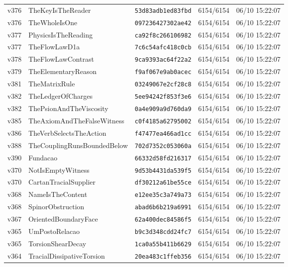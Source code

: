 \documentclass[11pt]{article}
\theoremstyle{definition}\newtheorem{deriv}{Derivação}
\begin{document}
{\begin{longtable}{@{}lllll@{}}
v376 & TheKeyIsTheReader & \texttt{53d83adb1ed83fbd} & 6154/6154 & 06/10 15:22:07 \\
v376 & TheWholeIsOne & \texttt{097236427302ae42} & 6154/6154 & 06/10 15:22:07 \\
v377 & PhysicsIsTheReading & \texttt{ca92f8c266106982} & 6154/6154 & 06/10 15:22:07 \\
v377 & TheFlowLawD1a & \texttt{7c6c54afc418c0cb} & 6154/6154 & 06/10 15:22:07 \\
v378 & TheFlowLawContrast & \texttt{9ca9393ac64f22a2} & 6154/6154 & 06/10 15:22:07 \\
v379 & TheElementaryReason & \texttt{f9af067e9ab0acec} & 6154/6154 & 06/10 15:22:07 \\
v381 & TheMatrixRule & \texttt{03249067e2cf28c8} & 6154/6154 & 06/10 15:22:07 \\
v382 & TheLedgerOfCharges & \texttt{5ee94242f853f3e6} & 6154/6154 & 06/10 15:22:07 \\
v382 & ThePsionAndTheViscosity & \texttt{0a4e909a9d760da9} & 6154/6154 & 06/10 15:22:07 \\
v385 & TheAxiomAndTheFalseWitness & \texttt{c0f4185a62795002} & 6154/6154 & 06/10 15:22:07 \\
v386 & TheVerbSelectsTheAction & \texttt{f47477ea466ad1cc} & 6154/6154 & 06/10 15:22:07 \\
v388 & TheCouplingRunsBoundedBelow & \texttt{702d7352c053060a} & 6154/6154 & 06/10 15:22:07 \\
v390 & Fundacao & \texttt{66332d58fd216317} & 6154/6154 & 06/10 15:22:07 \\
v370 & NotIsEmptyWitness & \texttt{9d53b4431da539f5} & 6154/6154 & 06/10 15:22:07 \\
v370 & CartanTracialSupplier & \texttt{df30212a61be55ce} & 6154/6154 & 06/10 15:22:07 \\
v368 & NameIsTheContent & \texttt{e12ee35c3a749a73} & 6154/6154 & 06/10 15:22:07 \\
v368 & SpinorObstruction & \texttt{abad6b6b219a6991} & 6154/6154 & 06/10 15:22:07 \\
v367 & OrientedBoundaryFace & \texttt{62a400dec84586f5} & 6154/6154 & 06/10 15:22:07 \\
v365 & UmPostoRelacao & \texttt{b9c3d348cdd24fc7} & 6154/6154 & 06/10 15:22:07 \\
v365 & TorsionShearDecay & \texttt{1ca0a55b411b6629} & 6154/6154 & 06/10 15:22:07 \\
v364 & TracialDissipativeTorsion & \texttt{20ea483c1ffeb356} & 6154/6154 & 06/10 15:22:07 \\

\end{longtable}}
\end{document}
